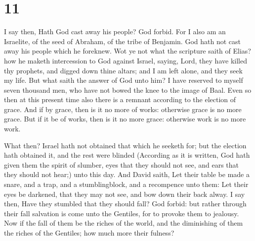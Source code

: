 \hypertarget{section-10}{%
\section{11}\label{section-10}}

 I say then, Hath God cast away his people? God forbid.
For I also am an Israelite, of the seed of Abraham, of the tribe of
Benjamin.  God hath not cast away his people which he
foreknew. Wot ye not what the scripture saith of Elias? how he maketh
intercession to God against Israel, saying,  Lord, they
have killed thy prophets, and digged down thine altars; and I am left
alone, and they seek my life.  But what saith the answer
of God unto him? I have reserved to myself seven thousand men, who have
not bowed the knee to the image of Baal.  Even so then at
this present time also there is a remnant according to the election of
grace.  And if by grace, then is it no more of works:
otherwise grace is no more grace. But if it be of works, then is it no
more grace: otherwise work is no more work.

 What then? Israel hath not obtained that which he seeketh
for; but the election hath obtained it, and the rest were blinded
 (According as it is written, God hath given them the
spirit of slumber, eyes that they should not see, and ears that they
should not hear;) unto this day.  And David saith, Let
their table be made a snare, and a trap, and a stumblingblock, and a
recompence unto them:  Let their eyes be darkened, that
they may not see, and bow down their back alway.  I say
then, Have they stumbled that they should fall? God forbid: but rather
through their fall salvation is come unto the Gentiles, for to provoke
them to jealousy.  Now if the fall of them be the riches
of the world, and the diminishing of them the riches of the Gentiles;
how much more their fulness?

